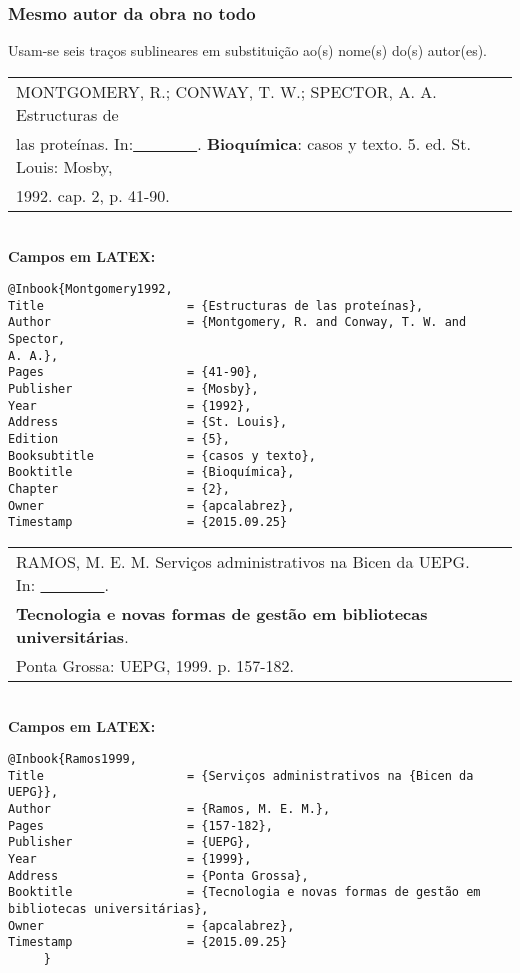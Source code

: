\subsubsection{Mesmo autor da obra no todo}

Usam-se seis traços sublineares em substituição ao(s) nome(s) do(s) autor(es). \\
	 
\begin{tabular}{|l|c|} \hline
MONTGOMERY, R.; CONWAY, T. W.; SPECTOR, A. A. Estructuras de \\las proteínas.  In:\underline{\ \ \ \ \ \ \ \ }. \textbf{Bioquímica}: casos y texto. 5. ed. St. Louis:
	Mosby, \\1992. cap. 2, p. 41-90.  \\\hline
\end{tabular} \\ 

\textbf{Campos em LATEX:} 

\begin{verbatim}
@Inbook{Montgomery1992,
Title                    = {Estructuras de las proteínas},
Author                   = {Montgomery, R. and Conway, T. W. and 
Spector, 
A. A.},
Pages                    = {41-90},
Publisher                = {Mosby},
Year                     = {1992},
Address                  = {St. Louis},
Edition                  = {5},
Booksubtitle             = {casos y texto},
Booktitle                = {Bioquímica},
Chapter                  = {2},
Owner                    = {apcalabrez},
Timestamp                = {2015.09.25}
\end{verbatim}
	 
\begin{tabular}{|l|c|} \hline
RAMOS, M. E. M. Serviços administrativos na Bicen da UEPG. In:
\underline{\ \ \ \ \ \ \ \ }. \\ \textbf{Tecnologia e novas formas de gestão em bibliotecas
universitárias}. \\Ponta Grossa: UEPG, 1999. p. 157-182.   \\\hline
	 \end{tabular} \\ 
	 
	 \textbf{Campos em LATEX:} 
	 
\begin{verbatim}
@Inbook{Ramos1999,
Title                    = {Serviços administrativos na {Bicen da UEPG}},
Author                   = {Ramos, M. E. M.},
Pages                    = {157-182},
Publisher                = {UEPG},
Year                     = {1999},
Address                  = {Ponta Grossa},
Booktitle                = {Tecnologia e novas formas de gestão em 
bibliotecas universitárias},
Owner                    = {apcalabrez},
Timestamp                = {2015.09.25}
	 }
\end{verbatim}

